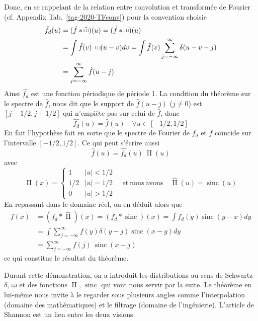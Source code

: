 \documentclass[11pt,twoside]{article}
\DeclareMathOperator{\sinc}{sinc}
\DeclareMathOperator{\comb}{\raisebox{\depth}{\rotatebox{270}{$\exists$}}}
\DeclareMathOperator{\boxcar}{{\mbox{$\Pi$}}}
\newcommand{\nn}{\nonumber}
\begin{document}
Donc, en se rappelant de la relation entre convolution et transformée de Fourier (cf. Appendix Tab.~\ref{tag-2020-TFconv}) pour la convention choisie 
\begin{align}
\hat{f_d}(u) &= (\hat{f} \ast \hat{\comb})(u) = (\hat{f} \ast \comb)(u) \label{eq:fdhatcont}\\
&= \int \hat{f}(v)\ \comb(u-v) dv = \int \hat{f}(v) \sum_{j=-\infty}^{\infty} \delta(u-v-j) \nonumber \\
&= \sum_{j=-\infty}^{\infty} \hat{f}(u-j)
\end{align}
Ainsi $\hat{f_d}$ est une fonction périodique de période 1. La condition du théorème sur le spectre de $\hat{f}$, nous dit que le support de  $\hat{f}(u-j)$ ($j\neq 0$) est $[j-1/2,j+1/2]$ qui n'empiète pas sur celui de $\hat{f}$, donc 
\begin{equation}
\hat{f_d}(u) = \hat{f}(u) \quad \forall u \in [-1/2,1/2]
\end{equation}
En fait l'hypothèse fait en sorte que le spectre de Fourier de $f_d$ et $f$ coïncide sur l'intervalle $[-1/2,1/2]$. Ce qui peut s'écrire aussi
\begin{equation}
\hat{f}(u)  = \hat{f_d}(u)\ \boxcar(u)
\end{equation}
avec
\begin{equation}
 \boxcar(x) = \begin{cases}
 1 & |u|<1/2 \\
1/2 & |u|=1/2 \\
0 & |u| > 1/2
 \end{cases} \quad \mathrm{et\ nous\ avons}\quad \hat{\boxcar}(u) = \sinc(u)
\end{equation}
En repassant dans le domaine réel, on en déduit alors que
\begin{align}
f(x) & = (f_d \ast \hat{\boxcar})(x) = (f_d \ast \sinc)(x) = \int f_d(y)\sinc(y-x) dy \nn \\
	&= \int \sum_{j=-\infty}^{\infty} f(y) \delta(y-j) \sinc(x-y) dy \nn \\
	&= \sum_{j=-\infty}^{\infty} f(j)\ \sinc(x-j)
\end{align}
ce qui constitue le résultat du théorème.

Durant cette démonstration, on a introduit les distributions au sens de Schwartz $\delta$, $\comb$ et des fonctions $\boxcar$, $\sinc$ qui vont nous servir par la suite. Le théorème en lui-même nous invite à le regarder sous plusieurs angles comme l'interpolation (domaine des mathématiques) et le filtrage (domaine de l'ingénierie). L'article de Shannon est un lien entre les deux visions. 
\end{document}
